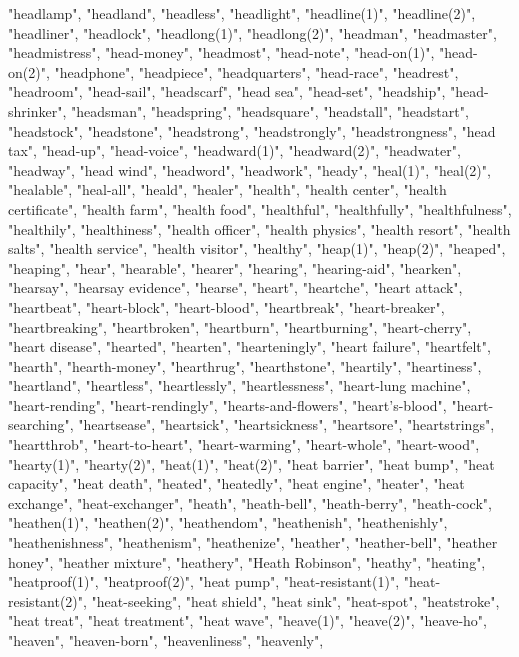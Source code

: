 "headlamp",
"headland",
"headless",
"headlight",
"headline(1)",
"headline(2)",
"headliner",
"headlock",
"headlong(1)",
"headlong(2)",
"headman",
"headmaster",
"headmistress",
"head-money",
"headmost",
"head-note",
"head-on(1)",
"head-on(2)",
"headphone",
"headpiece",
"headquarters",
"head-race",
"headrest",
"headroom",
"head-sail",
"headscarf",
"head sea",
"head-set",
"headship",
"head-shrinker",
"headsman",
"headspring",
"headsquare",
"headstall",
"headstart",
"headstock",
"headstone",
"headstrong",
"headstrongly",
"headstrongness",
"head tax",
"head-up",
"head-voice",
"headward(1)",
"headward(2)",
"headwater",
"headway",
"head wind",
"headword",
"headwork",
"heady",
"heal(1)",
"heal(2)",
"healable",
"heal-all",
"heald",
"healer",
"health",
"health center",
"health certificate",
"health farm",
"health food",
"healthful",
"healthfully",
"healthfulness",
"healthily",
"healthiness",
"health officer",
"health physics",
"health resort",
"health salts",
"health service",
"health visitor",
"healthy",
"heap(1)",
"heap(2)",
"heaped",
"heaping",
"hear",
"hearable",
"hearer",
"hearing",
"hearing-aid",
"hearken",
"hearsay",
"hearsay evidence",
"hearse",
"heart",
"heartche",
"heart attack",
"heartbeat",
"heart-block",
"heart-blood",
"heartbreak",
"heart-breaker",
"heartbreaking",
"heartbroken",
"heartburn",
"heartburning",
"heart-cherry",
"heart disease",
"hearted",
"hearten",
"hearteningly",
"heart failure",
"heartfelt",
"hearth",
"hearth-money",
"hearthrug",
"hearthstone",
"heartily",
"heartiness",
"heartland",
"heartless",
"heartlessly",
"heartlessness",
"heart-lung machine",
"heart-rending",
"heart-rendingly",
"hearts-and-flowers",
"heart's-blood",
"heart-searching",
"heartsease",
"heartsick",
"heartsickness",
"heartsore",
"heartstrings",
"heartthrob",
"heart-to-heart",
"heart-warming",
"heart-whole",
"heart-wood",
"hearty(1)",
"hearty(2)",
"heat(1)",
"heat(2)",
"heat barrier",
"heat bump",
"heat capacity",
"heat death",
"heated",
"heatedly",
"heat engine",
"heater",
"heat exchange",
"heat-exchanger",
"heath",
"heath-bell",
"heath-berry",
"heath-cock",
"heathen(1)",
"heathen(2)",
"heathendom",
"heathenish",
"heathenishly",
"heathenishness",
"heathenism",
"heathenize",
"heather",
"heather-bell",
"heather honey",
"heather mixture",
"heathery",
"Heath Robinson",
"heathy",
"heating",
"heatproof(1)",
"heatproof(2)",
"heat pump",
"heat-resistant(1)",
"heat-resistant(2)",
"heat-seeking",
"heat shield",
"heat sink",
"heat-spot",
"heatstroke",
"heat treat",
"heat treatment",
"heat wave",
"heave(1)",
"heave(2)",
"heave-ho",
"heaven",
"heaven-born",
"heavenliness",
"heavenly",
